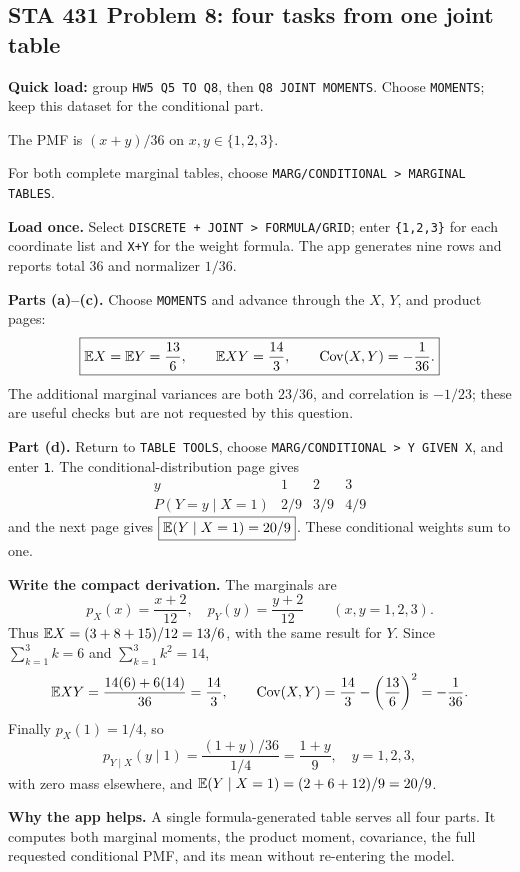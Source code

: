 \subsection{STA 431 Problem 8: four tasks from one joint table}
\textbf{Quick load:} group \texttt{HW5 Q5 TO Q8}, then \texttt{Q8 JOINT MOMENTS}. Choose \texttt{MOMENTS}; keep this dataset for the conditional part.

The PMF is $(x+y)/36$ on $x,y\in\{1,2,3\}$.

For both complete marginal tables, choose \texttt{MARG/CONDITIONAL > MARGINAL TABLES}.

\textbf{Load once.} Select \texttt{DISCRETE + JOINT > FORMULA/GRID}; enter \texttt{\{1,2,3\}} for each coordinate list and \texttt{X+Y} for the weight formula. The app generates nine rows and reports total 36 and normalizer $1/36$.

\textbf{Parts (a)--(c).} Choose \texttt{MOMENTS} and advance through the $X$, $Y$, and product pages:
\[
\boxed{\mathbb E X=\mathbb E Y=\frac{13}{6},\qquad \mathbb E XY=\frac{14}{3},\qquad \operatorname{Cov}(X,Y)=-\frac1{36}.}
\]
The additional marginal variances are both $23/36$, and correlation is $-1/23$; these are useful checks but are not requested by this question.

\textbf{Part (d).} Return to \texttt{TABLE TOOLS}, choose \texttt{MARG/CONDITIONAL > Y GIVEN X}, and enter \texttt{1}. The conditional-distribution page gives
\[
\begin{array}{c|ccc}
y&1&2&3\\\hline
P(Y=y\mid X=1)&2/9&3/9&4/9
\end{array}
\]
and the next page gives $\boxed{\mathbb E(Y\mid X=1)=20/9}$. These conditional weights sum to one.

\textbf{Write the compact derivation.} The marginals are
\[
p_X(x)=\frac{x+2}{12},\quad p_Y(y)=\frac{y+2}{12}\qquad(x,y=1,2,3).
\]
Thus $\mathbb E X=(3+8+15)/12=13/6$, with the same result for $Y$. Since $\sum_{k=1}^3k=6$ and $\sum_{k=1}^3k^2=14$,
\[
\mathbb E XY=\frac{14(6)+6(14)}{36}=\frac{14}{3},\qquad
\operatorname{Cov}(X,Y)=\frac{14}{3}-\left(\frac{13}{6}\right)^2=-\frac1{36}.
\]
Finally $p_X(1)=1/4$, so
\[
p_{Y\mid X}(y\mid1)=\frac{(1+y)/36}{1/4}=\frac{1+y}{9},\quad y=1,2,3,
\]
with zero mass elsewhere, and $\mathbb E(Y\mid X=1)=(2+6+12)/9=20/9$.

\textbf{Why the app helps.} A single formula-generated table serves all four parts. It computes both marginal moments, the product moment, covariance, the full requested conditional PMF, and its mean without re-entering the model.

